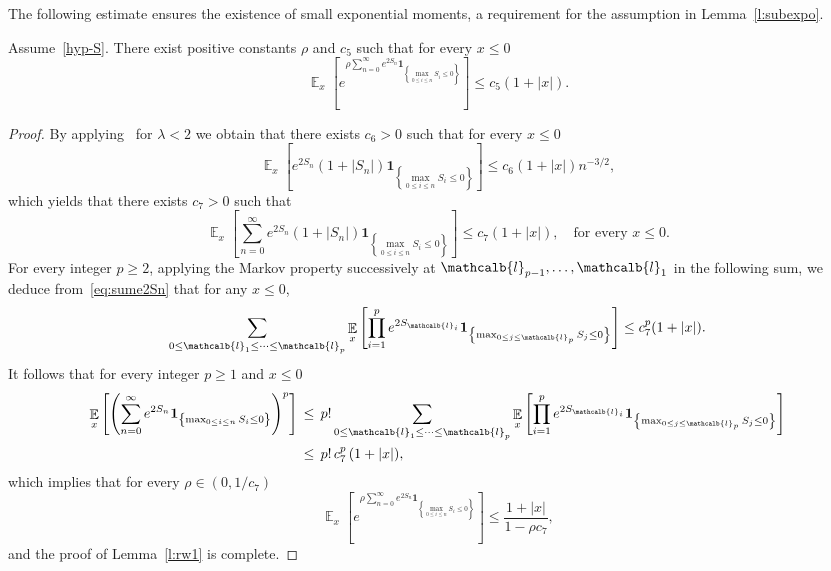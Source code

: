 \documentclass[AHL,Unicode,longabstracts,published]{cedram}
\newcommand{\ind}{\mathbf{1}}
\DeclareMathOperator{\e}{\mathbb{E}}
\renewcommand{\ell}{\mathcalb{l}}
\begin{document}
The following estimate ensures the existence of small exponential moments, a requirement for the assumption in Lemma~\ref{l:subexpo}.


\begin{lemm}\label{l:rw1}
Assume~\eqref{hyp-S}. There exist positive constants $\rho$ and $c_5$ such that for every $x\le 0$
\begin{equation}
\e_x \left[e^{\rho \sum_{n=0}^\infty e^{ 2 S_n} \ind_{\left\{\max_{0\le i\le n} S_i \le 0\right\}} }\right]\le c_5 (1+|x|).
\end{equation}
\end{lemm}

\begin{proof}
By applying~\cite[Corollary~4.2]{kersting-vatutin} for $\lambda<2$ we obtain that there exists $c_6>0$ such that for every $x \le 0$
\begin{equation*}
\e_x \left[e^{2 S_n} (1+ |S_n|) \ind_{\left\{\max_{0\le i\le n} S_i \le 0\right\}}\right]
\le c_6 (1+|x|) n^{-3/2},
\end{equation*}
which yields that there exists $c_7>0$ such that
\begin{equation}\label{eq:sume2Sn}
\e_x \left[\sum_{n=0}^\infty e^{2 S_n} (1+ |S_n|) \ind_{\left\{\max_{0\le i\le n} S_i \le 0\right\}}\right]\le c_7 (1+|x|), \quad \text{for every } x\le 0.
\end{equation}
For every integer $p\ge 2$, applying the Markov property successively at ${\ell_{p-1}},\dots, \ell_1$ in the following sum, we deduce from~\eqref{eq:sume2Sn} that for any $x\le 0$,
\begin{equation*}
\sum_{0\le \ell_1\le\dots\le \ell_p}\e_x \left[\prod_{i=1}^{p} e^{2 S_{\ell_i}} \ind_{\left\{\max_{0\le j \le \ell_p} S_j \le 0\right\}}\right]
\le c_7^p (1+|x|).
\end{equation*}
It follows that for every integer $p\ge 1$ and $x\le 0$
\begin{align*}
\e_x \left[\left(\sum_{n=0}^\infty e^{2 S_n} \ind_{\left\{\max_{0\le i\le n} S_i \le 0\right\}}\right)^p\right]
\, & \le\, p! \sum_{0\le \ell_1\le\dots\le \ell_p}\e_x \left[\prod_{i=1}^{p} e^{2 S_{\ell_i}} \ind_{\left\{\max_{0\le j \le \ell_p} S_j \le 0\right\}}\right]
\\
\, & \le\, p! \, c_7^p \, (1+|x|),
\end{align*}
which implies that for every $\rho \in (0, 1/c_7)$
\begin{equation*}
\e_x\left[e^{\rho \sum_{n=0}^\infty e^{ 2 S_n} \ind_{\left\{\max_{0\le i\le n} S_i \le 0\right\}}}\right]\le \frac{1+|x|}{1- \rho  c_7},
\end{equation*}
and the proof of Lemma~\ref{l:rw1} is complete.
\end{proof}
\end{document}
